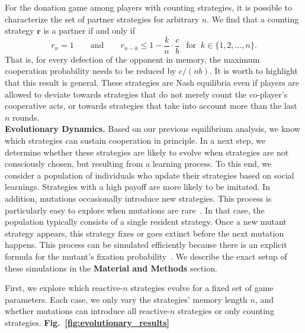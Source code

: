 \documentclass[11pt]{article}
\newcommand{\figref}[1]{{\textbf{Fig.~\ref{#1}}}}
\def\methods{\textbf{Material and Methods}}
\begin{document}
For the donation game among players with counting strategies, it is possible to characterize the set of partner strategies for arbitrary $n$. We find that a counting strategy $\mathbf{r}$ is a partner if and only if
\begin{equation}
  r_n = 1 \qquad \text{and} \qquad r_{n - k} \le 1\! -\! \frac{k}{n} \!\cdot\! \frac{c}{b}~~ \text{ for }~k \!\in\! \{1, 2, \dots, n\}.
\end{equation}
That is, for every defection of the opponent in memory, the maximum cooperation probability needs to be reduced by $c/(nb)$.
It is worth to highlight that this result is general. 
These strategies are Nash equilibria even if players are allowed to deviate towards strategies that do not merely count the co-player's cooperative acts, or towards strategies that take into account more than the last $n$ rounds.\\ 



\noindent
\textbf{Evolutionary Dynamics.}
Based on our previous equilibrium analysis, we know which strategies can sustain cooperation in principle. 
In a next step, we determine whether these strategies are likely to evolve when strategies are not consciously chosen, but resulting from a learning process. 
To this end, we consider a population of individuals who update their strategies based on social learnings. 
Strategies with a high payoff are more likely to be imitated. 
In addition, mutations occasionally introduce new strategies.
This process is particularly easy to explore when mutations are rare~\cite{fudenberg:JET:2006,wu:JMB:2012,imhof:royal:2010,mcavoy:jet:2015}. 
In that case, the population typically consists of a single resident strategy.  
Once a new mutant strategy appears, this strategy fixes or goes extinct before the next mutation happens. 
This process can be simulated efficiently because there is an explicit formula for the mutant's fixation probability~\citep{nowak:Nature:2004}. 
We describe the exact setup of these simulations in the \methods{} section.

First, we explore which reactive-$n$ strategies evolve for a fixed set of game parameters. 
Each case, we only vary the strategies' memory length $n$, and whether mutations can introduce all reactive-$n$ strategies or only counting strategies. 
\figref{fig:evolutionary_results}
\end{document}
